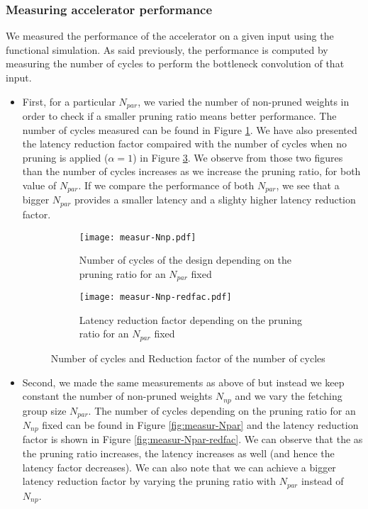\subsubsection{Measuring accelerator performance}
%
We measured the performance of the accelerator on a given input using the functional simulation. As said previously, the performance is computed by measuring the number of cycles to perform the bottleneck convolution of that input.
%
\begin{itemize}
    \item First, for a particular $N_{par}$, we varied the number of non-pruned weights in order to check if a smaller pruning ratio means better performance. The number of cycles measured can be found in Figure \ref{fig:measur-Nnp}. We have also presented the latency reduction factor compaired with the number of cycles when no pruning is applied ($\alpha = 1$) in Figure \ref{fig:measur-Nnp-redfac}. We observe from those two figures than the number of cycles increases as we increase the pruning ratio, for both value of $N_{par}$. If we compare the performance of both $N_{par}$, we see that a bigger $N_{par}$ provides a smaller latency and a slighty higher latency reduction factor.
    \begin{figure}
        \centering
        \begin{subfigure}[t]{.49\textwidth}
            \centering
            \texttt{[image: measur-Nnp.pdf]}
            \caption{Number of cycles of the design depending on the pruning ratio for an $N_{par}$ fixed}
            \label{fig:measur-Nnp}
        \end{subfigure}
        \begin{subfigure}[t]{.49\textwidth}
            \centering
            \texttt{[image: measur-Nnp-redfac.pdf]}
            \caption{Latency reduction factor depending on the pruning ratio for an $N_{par}$ fixed}
            \label{fig:measur-Nnp-redfac}
        \end{subfigure}
        \caption{Number of cycles and Reduction factor of the number of cycles}
    \end{figure}
    \item Second, we made the same measurements as above of but instead we keep constant the number of non-pruned weights $N_{np}$ and we vary the fetching group size $N_{par}$. The number of cycles depending on the pruning ratio for an $N_{np}$ fixed can be found in Figure \ref{fig:measur-Npar} and the latency reduction factor is shown in Figure \ref{fig:measur-Npar-redfac}. We can observe that the as the pruning ratio increases, the latency increases as well (and hence the latency factor decreases). We can also note that we can achieve a bigger latency reduction factor by varying the pruning ratio with $N_{par}$ instead of $N_{np}$.

\end{itemize}
